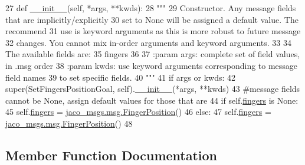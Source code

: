 \begin{DoxyCode}
27   \textcolor{keyword}{def }\hyperlink{classjaco__msgs_1_1msg_1_1__SetFingersPositionGoal_1_1SetFingersPositionGoal_a09656f4b2b9739334caa1a270b85504e}{\_\_init\_\_}(self, *args, **kwds):
28     \textcolor{stringliteral}{"""}
29 \textcolor{stringliteral}{    Constructor. Any message fields that are implicitly/explicitly}
30 \textcolor{stringliteral}{    set to None will be assigned a default value. The recommend}
31 \textcolor{stringliteral}{    use is keyword arguments as this is more robust to future message}
32 \textcolor{stringliteral}{    changes.  You cannot mix in-order arguments and keyword arguments.}
33 \textcolor{stringliteral}{}
34 \textcolor{stringliteral}{    The available fields are:}
35 \textcolor{stringliteral}{       fingers}
36 \textcolor{stringliteral}{}
37 \textcolor{stringliteral}{    :param args: complete set of field values, in .msg order}
38 \textcolor{stringliteral}{    :param kwds: use keyword arguments corresponding to message field names}
39 \textcolor{stringliteral}{    to set specific fields.}
40 \textcolor{stringliteral}{    """}
41     \textcolor{keywordflow}{if} args \textcolor{keywordflow}{or} kwds:
42       super(SetFingersPositionGoal, self).\hyperlink{classjaco__msgs_1_1msg_1_1__SetFingersPositionGoal_1_1SetFingersPositionGoal_a09656f4b2b9739334caa1a270b85504e}{\_\_init\_\_}(*args, **kwds)
43       \textcolor{comment}{#message fields cannot be None, assign default values for those that are}
44       \textcolor{keywordflow}{if} self.\hyperlink{classjaco__msgs_1_1msg_1_1__SetFingersPositionGoal_1_1SetFingersPositionGoal_ab7578aa64d5376794159263ab55d0543}{fingers} \textcolor{keywordflow}{is} \textcolor{keywordtype}{None}:
45         self.\hyperlink{classjaco__msgs_1_1msg_1_1__SetFingersPositionGoal_1_1SetFingersPositionGoal_ab7578aa64d5376794159263ab55d0543}{fingers} = \hyperlink{classjaco__msgs_1_1msg_1_1__FingerPosition_1_1FingerPosition}{jaco\_msgs.msg.FingerPosition}()
46     \textcolor{keywordflow}{else}:
47       self.\hyperlink{classjaco__msgs_1_1msg_1_1__SetFingersPositionGoal_1_1SetFingersPositionGoal_ab7578aa64d5376794159263ab55d0543}{fingers} = \hyperlink{classjaco__msgs_1_1msg_1_1__FingerPosition_1_1FingerPosition}{jaco\_msgs.msg.FingerPosition}()
48 
\end{DoxyCode}


\subsection{Member Function Documentation}
